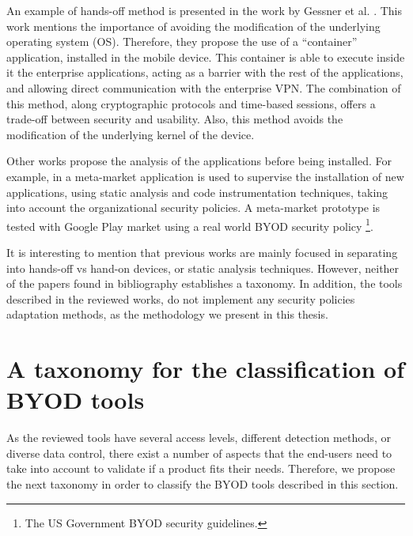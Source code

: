 An example of hands-off method is presented in the work by Gessner et al. \cite{Gessner13userfriendly}. This work mentions the importance of avoiding the modification of the underlying operating system (OS). Therefore, they propose the use of a ``container'' application, installed in the mobile device. This container is able to execute inside it the enterprise applications, acting as a barrier with the rest of the applications, and allowing direct communication with the enterprise VPN. The combination of this method, along cryptographic protocols and time-based sessions, offers a trade-off between security and usability. Also, this method avoids the modification of the underlying kernel of the device.

Other works propose the analysis of the applications before being installed. For example, in \cite{Armando14metamarket} a meta-market application is used to supervise the installation of new applications, using static analysis and code instrumentation techniques, taking into account the organizational security policies. A meta-market prototype is tested with Google Play market using a real world BYOD security policy \footnote{The US Government BYOD security guidelines.}.

It is interesting to mention that previous works are mainly focused in separating into hands-off vs hand-on devices, or static analysis techniques. However, neither of the papers found in bibliography establishes a taxonomy. In addition, the tools described in the reviewed works, do not implement any security policies adaptation methods, as the methodology we present in this thesis.

\section{A taxonomy for the classification of BYOD tools}
\label{sec:taxonomy}

As the reviewed tools have several access levels, different detection methods, or diverse data control, there exist a number of aspects that the end-users need to take into account to validate if a product fits their needs. Therefore, we propose the next taxonomy in order to classify the BYOD tools described in this section.

